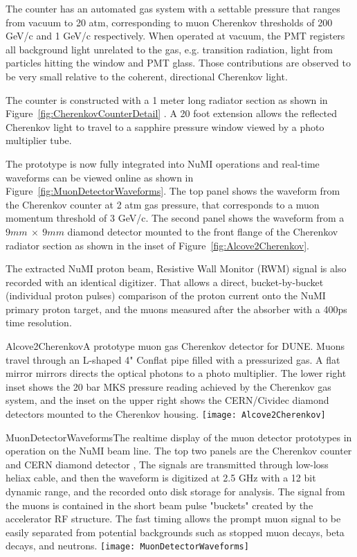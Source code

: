 The counter has an automated gas system with a settable pressure that ranges
from vacuum to 20 atm, corresponding to muon Cherenkov thresholds of 
200 GeV/c and 1 GeV/c respectively. When operated at vacuum, the PMT registers all background light
unrelated to the gas, e.g. transition radiation, light from particles hitting the window and PMT glass.
Those contributions are observed to be very small relative to the coherent, directional Cherenkov light.

The counter is constructed with a 1 meter long radiator section
as shown in Figure~\ref{fig:CherenkovCounterDetail} . A 20 foot extension allows the reflected 
Cherenkov light to travel to a sapphire pressure window viewed by a photo multiplier tube.

The prototype is now fully integrated into NuMI operations and real-time waveforms can be viewed online as shown in Figure~\ref{fig:MuonDetectorWaveforms}. The top panel shows the waveform from the Cherenkov counter at 2 atm gas pressure, that corresponds to a muon momentum threshold of 3 GeV/c. The second panel shows the waveform from a $9mm\ \times\ 9mm$ diamond detector mounted to the front flange of the Cherenkov radiator section as shown in the inset 
of Figure~\ref{fig:Alcove2Cherenkov}.

The extracted NuMI proton beam, Resistive Wall Monitor (RWM) signal 
is also recorded with an identical digitizer. That allows a direct, bucket-by-bucket (individual proton pulses) 
comparison of the proton current onto the NuMI primary proton target, and the muons measured after the absorber with a 400ps time resolution.

\begin{cdrfigure}{Alcove2Cherenkov}{A prototype muon gas Cherenkov detector for DUNE.  
Muons travel through an L-shaped 4" Conflat pipe filled with a pressurized gas. A flat mirror mirrors directs the optical photons to a photo multiplier. The lower right inset shows the 20 bar MKS pressure reading achieved by the Cherenkov gas system, and the inset on the upper right shows the CERN/Cividec diamond detectors mounted to the Cherenkov housing.}
\texttt{[image: Alcove2Cherenkov]}
\end{cdrfigure}

\begin{cdrfigure}{MuonDetectorWaveforms}{The realtime display of the
muon detector prototypes in operation on the NuMI beam line. The top two panels are the Cherenkov counter and CERN diamond detector \cite{ref:CERNdiamond}, The signals are transmitted through low-loss heliax cable, and then the waveform is digitized at 2.5 GHz with a 12 bit dynamic range, and the recorded onto disk storage for analysis. The signal from the muons is contained in the short beam pulse "buckets" created by the accelerator RF structure. The fast timing allows the prompt muon signal to be easily separated from potential backgrounds such as stopped muon decays, beta decays, and neutrons.}
\texttt{[image: MuonDetectorWaveforms]}
\end{cdrfigure}

